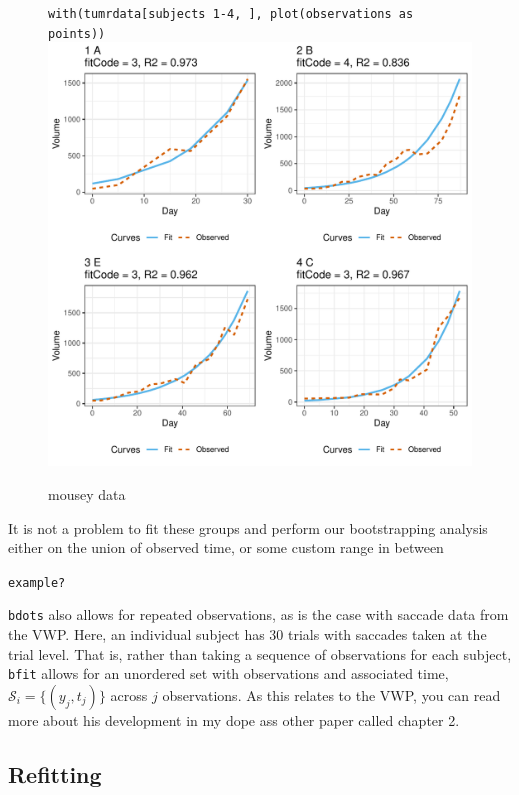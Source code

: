 \documentclass{article}
\begin{document}
\begin{figure}
\centering
\texttt{with(tumrdata[subjects 1-4, ], plot(observations as points))}
\includegraphics[scale=0.75]{img/mouse.png}
\caption{mousey data}
\end{figure}



It is not a problem to fit these groups and perform our bootstrapping analysis either on the union of observed time, or some custom range in between

\begin{center}
\texttt{example?}
\end{center}

\texttt{bdots} also allows for repeated observations, as is the case with saccade data from the VWP. Here, an individual subject has 30 trials with saccades taken at the trial level. That is, rather than taking a sequence of observations for each subject, \texttt{bfit} allows for an unordered set with observations and associated time, $\mathcal{S}_i = \{(y_j, t_j)\}$ across $j$ observations. As this relates to the VWP, you can read more about his development in my dope ass other paper called chapter 2.


\subsection{Refitting}
\end{document}
